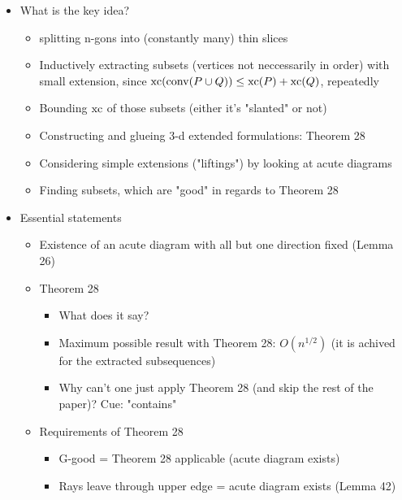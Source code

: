 

\begin{itemize}
  \item What is the key idea?
  \begin{itemize}
    \item splitting n-gons into (constantly many) thin slices
    \item Inductively extracting subsets (vertices not neccessarily in order) with small extension, since $\operatorname{xc}(\operatorname{conv}(P \cup Q)) \leq \operatorname{xc}(P) + \operatorname{xc}(Q)$, repeatedly
    \item Bounding $\operatorname{xc}$ of those subsets (either it's "slanted" or not)
    \item Constructing and glueing 3-d extended formulations: Theorem 28
    \item Considering simple extensions ("liftings") by looking at acute diagrams
    \item Finding subsets, which are "good" in regards to Theorem 28
  \end{itemize}
  \item Essential statements
  \begin{itemize}
    \item Existence of an acute diagram with all but one direction fixed (Lemma 26)
    \item Theorem 28
    \begin{itemize}
      \item What does it say?
      \item Maximum possible result with Theorem 28: $O(n^{1/2})$ (it is achived for the extracted subsequences)
      \item Why can't one just apply Theorem 28 (and skip the rest of the paper)? Cue: "contains"
    \end{itemize}
    \item Requirements of Theorem 28
    \begin{itemize}
      \item G-good = Theorem 28 applicable (acute diagram exists)
      \item Rays leave through upper edge = acute diagram exists (Lemma 42)
    \end{itemize}

\end{itemize}
\end{itemize}
